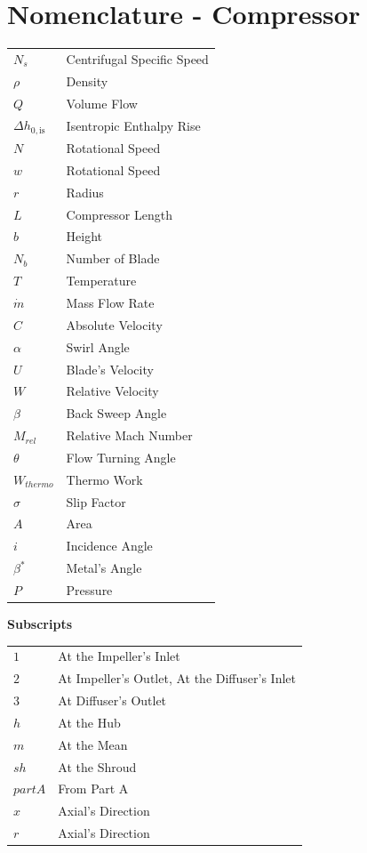 \documentclass[12pt, letter]{report}
\begin{document}
\section*{Nomenclature - Compressor}
\begin{longtable*}{@{}l @{\quad  -  \quad} l@{}}

$N_s$ & Centrifugal Specific Speed \\
${\rho}$ & Density \\
$Q$ & Volume Flow \\
$\Delta h_{0,\text{is}}$ & Isentropic Enthalpy Rise \\
$N$ &  Rotational Speed\\
$w$  &  Rotational Speed\\
$r$ & Radius \\
$L$ &  Compressor Length\\
$b$ & Height \\
$N_b$ & Number of Blade\\
$T$ & Temperature\\
$\dot m$ & Mass Flow Rate\\
$C$ & Absolute Velocity\\
$\alpha$ & Swirl Angle \\
$U$ & Blade's Velocity\\
$W$ & Relative Velocity\\
$\beta$ & Back Sweep Angle\\
$M_{rel}$ & Relative Mach Number\\
$\theta$ & Flow Turning Angle\\
$W_{thermo}$ & Thermo Work\\
$\sigma$ & Slip Factor\\
$A$ & Area\\
$i$ & Incidence Angle\\
$\beta ^*$ & Metal's Angle\\
$P$ & Pressure\\

\end{longtable*}
\begin{center}
   \textbf{Subscripts} \\
\end{center}

\begin{longtable*}{@{}l @{\quad  -  \quad} l@{}}

$1$ & At the Impeller's Inlet\\
$2$ & At Impeller's Outlet, At the Diffuser's Inlet \\
3 & At Diffuser's Outlet\\
$h$ & At the Hub\\
$m$ & At the Mean\\
$sh$ & At the Shroud\\
$partA$ & From Part A\\
$x$ & Axial's Direction\\
$r$ & Axial's Direction\\

\end{longtable*}
\end{document}
